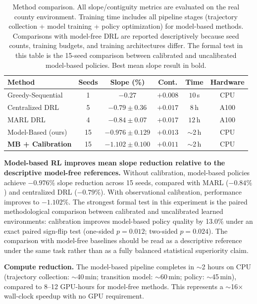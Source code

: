 \documentclass[11pt]{article}
\begin{document}
\begin{table}[htbp]
\centering
\caption{Method comparison. All slope/contiguity metrics are evaluated on the real county environment. Training time includes all pipeline stages (trajectory collection + model training + policy optimization) for model-based methods. Comparisons with model-free DRL are reported descriptively because seed counts, training budgets, and training architectures differ. The formal test in this table is the 15-seed comparison between calibrated and uncalibrated model-based policies. Best mean slope result in bold.}
\label{tab:main}
\begin{tabular}{lccccc}
\toprule
Method & Seeds & Slope (\%) & Cont. & Time & Hardware \\
\midrule
Greedy-Sequential      & 1  & $-0.27$              & $+0.008$ & $10$\,s   & CPU \\
Centralized DRL        & 5  & $-0.79 \pm 0.36$     & $+0.017$ & $8$\,h    & A100 \\
MARL DRL               & 4  & $-0.84 \pm 0.07$     & $+0.017$ & $12$\,h   & A100 \\
\midrule
Model-Based (ours)     & 15 & $-0.976 \pm 0.129$   & $+0.013$ & $\sim$2\,h & CPU \\
\textbf{MB + Calibration} & 15 & $\mathbf{-1.102 \pm 0.100}$ & $+0.011$ & $\sim$2\,h & CPU \\
\bottomrule
\end{tabular}
\end{table}

\textbf{Model-based RL improves mean slope reduction relative to the descriptive model-free references.} Without calibration, model-based policies achieve $-0.976\%$ slope reduction across 15 seeds, compared with MARL ($-0.84\%$) and centralized DRL ($-0.79\%$). With observational calibration, performance improves to $-1.102\%$. The strongest formal test in this experiment is the paired methodological comparison between calibrated and uncalibrated learned environments: calibration improves model-based policy quality by 13.0\% under an exact paired sign-flip test (one-sided $p=0.012$; two-sided $p=0.024$). The comparison with model-free baselines should be read as a descriptive reference under the same task rather than as a fully balanced statistical superiority claim.

\textbf{Compute reduction.} The model-based pipeline completes in $\sim$2 hours on CPU (trajectory collection: $\sim$40\,min; transition model: $\sim$60\,min; policy: $\sim$45\,min), compared to 8--12 GPU-hours for model-free methods. This represents a $\sim$16$\times$ wall-clock speedup with no GPU requirement.
\end{document}

